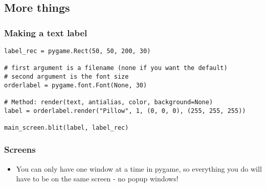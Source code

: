 \documentclass[letterpaper,10pt,english]{/usr/local/lib/python2.7/dist-packages/sphinx/texinputs/sphinxhowto}
\begin{document}
\subsection{More things}\subsubsection{Making a text label}\begin{verbatim}
label_rec = pygame.Rect(50, 50, 200, 30)

# first argument is a filename (none if you want the default)
# second argument is the font size
orderlabel = pygame.font.Font(None, 30)

# Method: render(text, antialias, color, background=None)
label = orderlabel.render("Pillow", 1, (0, 0, 0), (255, 255, 255))

main_screen.blit(label, label_rec)
\end{verbatim}\subsubsection{Screens}\begin{itemize}
\item
  You can only have one window at a time in pygame, so everything you do
  will have to be on the same screen - no popup windows!
\end{itemize}
        

        \renewcommand{\indexname}{Index}
        \printindex

    
\end{document}
